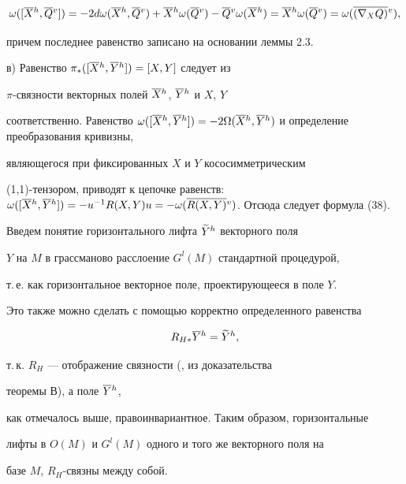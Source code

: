 \begin{pf}
$$


\w ([\olh X,\olv Q])=-2d\w (\olh X,\olv Q)+\olh X\w (\olv Q)-\olv Q\w(\olh X)=


\olh X\w (\olv Q)=\w (\olv {(\n XQ)}),


$$


причем последнее равенство записано на основании леммы 2.3.





в) Равенство $\pi_*([\overline {X}{}^h,\overline {Y}{}^h])=[X,Y]$ следует из


$\pi$-связности векторных полей $\overline {X}{}^h$, $\overline {Y}{}^h$ и $X$, $Y$


соответственно. Равенство $\w ([\olh X,\olh Y])=-2\Omega (\olh


X,\olh Y)$ и определение преобразования кривизны,


являющегося при фиксированных $X$ и $Y$ кососимметрическим


(1,1)-тензором, приводят к цепочке равенств: $\w ([\olh X, \olh


Y])=-u^{-1}R(X,Y)u=-\w (\olv {R(X,Y)})$. Отсюда следует формула (38).


\end{pf}





Введем понятие горизонтального лифта $\widetilde {Y}{}^h$ векторного поля


$Y$ на $M$ в грассманово расслоение $G^l(M)$ стандартной процедурой,


т.\,е. как горизонтальное векторное поле, проектирующееся в поле $Y$.


Это также можно сделать с помощью корректно определенного равенства


\begin{equation}


R_{H*}\olh Y=\grh Y,


\end{equation}


т.\,к. $R_H$ --- отображение связности (\cite{Far1}, из доказательства


теоремы В), а поле $\overline {Y}{}^h$,


как отмечалось выше, правоинвариантное. Таким образом, горизонтальные


лифты в $O(M)$ и $G^l(M)$ одного и того же векторного поля на


базе $M$, $R_H$-связны между собой.





